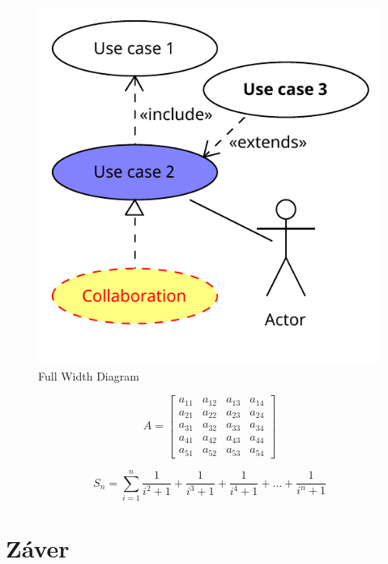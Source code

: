 \documentclass[10pt,twoside,slovak,a4paper]{article}
\begin{document}
\begin{figure}[htbp]
    \centering
    \includegraphics[width=\textwidth]{Diagrams/Diagram.pdf}
    \caption{Full Width Diagram}
    \label{fig:full_width_diagram}
\end{figure}

\begin{equation}
    A = \begin{bmatrix}
        a_{11} & a_{12} & a_{13} & a_{14} \\
        a_{21} & a_{22} & a_{23} & a_{24} \\
        a_{31} & a_{32} & a_{33} & a_{34} \\
        a_{41} & a_{42} & a_{43} & a_{44} \\
        a_{51} & a_{52} & a_{53} & a_{54}
    \end{bmatrix}
\end{equation}

\begin{equation}
    S_n = \sum_{i=1}^{n} \frac{1}{i^2 + 1} + \frac{1}{i^3 + 1} + \frac{1}{i^4 + 1} + \ldots + \frac{1}{i^n + 1}
\end{equation}

\section{Záver} \label{zaver} %







\end{document}

